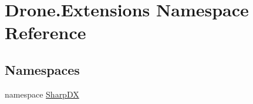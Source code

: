 \hypertarget{namespace_drone_1_1_extensions}{}\section{Drone.\+Extensions Namespace Reference}
\label{namespace_drone_1_1_extensions}
\subsection*{Namespaces}
\begin{DoxyCompactItemize}
\item 
namespace \hyperlink{namespace_drone_1_1_extensions_1_1_sharp_d_x}{Sharp\+D\+X}
\end{DoxyCompactItemize}
